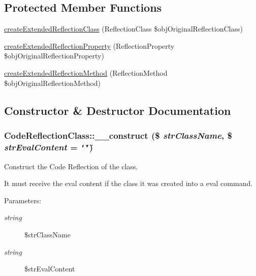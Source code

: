\subsection*{Protected Member Functions}
\begin{CompactItemize}
\item 
\hyperlink{class_code_reflection_class_496631cb5814727379cdacb689e4c40a}{createExtendedReflectionClass} (ReflectionClass \$objOriginalReflectionClass)
\item 
\hyperlink{class_code_reflection_class_838dcd22317018c53f02dda69cd07509}{createExtendedReflectionProperty} (ReflectionProperty \$objOriginalReflectionProperty)
\item 
\hyperlink{class_code_reflection_class_c8e58a7369660bf8f63ce39f3b9b5271}{createExtendedReflectionMethod} (ReflectionMethod \$objOriginalReflectionMethod)
\end{CompactItemize}


\subsection{Constructor \& Destructor Documentation}
\hypertarget{class_code_reflection_class_547ea2461cf205c8fa25418294c0980d}{
\subsubsection[{\_\-\_\-construct}]{\setlength{\rightskip}{0pt plus 5cm}CodeReflectionClass::\_\-\_\-construct (\$ {\em strClassName}, \/  \$ {\em strEvalContent} = {\tt \char`\"{}\char`\"{}})}}
\label{class_code_reflection_class_547ea2461cf205c8fa25418294c0980d}


Construct the Code Reflection of the class.

It must receive the eval content if the class it was created into a eval command.

\begin{Desc}
\item[Parameters:]
\begin{description}
\item[{\em string}]\$strClassName \item[{\em string}]\$strEvalContent \end{description}
\end{Desc}



